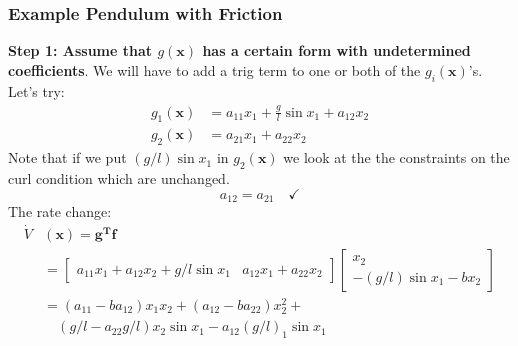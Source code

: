 \documentclass[11pt,handout]{beamer}   %
\begin{document}
\begin{frame}
\frametitle{Example Pendulum with Friction}
\small
\textbf{Step 1: Assume that $g(\mathbf{x})$ has a certain form with undetermined coefficients}. We will have to add a trig term to one or both of the $g_i(\mathbf{x})$'s. Let's try:
\begin{equation*}
\begin{aligned}
g_1(\mathbf{x}) &= a_{11}x_1 + \frac{g}{l} \sin x_1 + a_{12}x_2\\
g_2(\mathbf{x}) &= a_21 x_1 + a_22 x_2
\end{aligned}
\end{equation*}
Note that if we put $(g / l) \sin x_1$ in $g_2(\mathbf{x})$ we look at the the constraints on the curl condition which are unchanged.
\begin{equation*}
a_{12} = a_{21} \quad \checkmark
\end{equation*}
The rate change:
\begin{equation*}
\begin{aligned}
\dot{V}&(\mathbf{x}) = \mathbf{g^T f}\\
&= \begin{bmatrix}
a_{11} x_1 + a_{12} x_2 + g/l \sin x_1 & a_{12} x_1 + a_{22} x_2
\end{bmatrix}
\begin{bmatrix}
x_2 \\ -(g / l) \sin x_1 -b x_2
\end{bmatrix}\\
&= (a_{11} - b a_{12})x_1 x_2 + (a_{12}- b a_{22})x_2^2 + \\
&\quad(g/l - a_{22} g/l)x_2 \sin x_1 - a_{12}(g/l) _1 \sin x_1
\end{aligned}
\end{equation*}
\end{frame}
\end{document}
